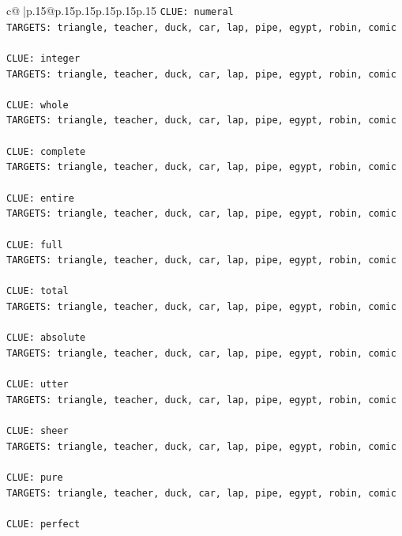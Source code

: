 \documentclass{article}
\begin{document}
{\begin{supertabular}{c@{$\;$}|p{.15\linewidth}@{}p{.15\linewidth}p{.15\linewidth}p{.15\linewidth}p{.15\linewidth}p{.15\linewidth}}
{{{\texttt{CLUE: numeral} \\
\texttt{TARGETS: triangle, teacher, duck, car, lap, pipe, egypt, robin, comic} \\
\\ 
\texttt{CLUE: integer} \\
\texttt{TARGETS: triangle, teacher, duck, car, lap, pipe, egypt, robin, comic} \\
\\ 
\texttt{CLUE: whole} \\
\texttt{TARGETS: triangle, teacher, duck, car, lap, pipe, egypt, robin, comic} \\
\\ 
\texttt{CLUE: complete} \\
\texttt{TARGETS: triangle, teacher, duck, car, lap, pipe, egypt, robin, comic} \\
\\ 
\texttt{CLUE: entire} \\
\texttt{TARGETS: triangle, teacher, duck, car, lap, pipe, egypt, robin, comic} \\
\\ 
\texttt{CLUE: full} \\
\texttt{TARGETS: triangle, teacher, duck, car, lap, pipe, egypt, robin, comic} \\
\\ 
\texttt{CLUE: total} \\
\texttt{TARGETS: triangle, teacher, duck, car, lap, pipe, egypt, robin, comic} \\
\\ 
\texttt{CLUE: absolute} \\
\texttt{TARGETS: triangle, teacher, duck, car, lap, pipe, egypt, robin, comic} \\
\\ 
\texttt{CLUE: utter} \\
\texttt{TARGETS: triangle, teacher, duck, car, lap, pipe, egypt, robin, comic} \\
\\ 
\texttt{CLUE: sheer} \\
\texttt{TARGETS: triangle, teacher, duck, car, lap, pipe, egypt, robin, comic} \\
\\ 
\texttt{CLUE: pure} \\
\texttt{TARGETS: triangle, teacher, duck, car, lap, pipe, egypt, robin, comic} \\
\\ 
\texttt{CLUE: perfect} \\
}}}
\end{supertabular}}
\end{document}
